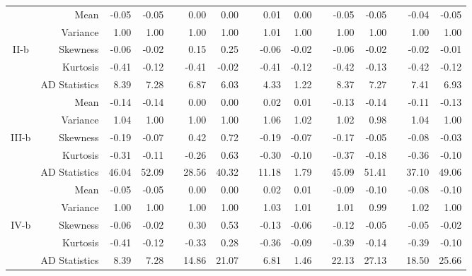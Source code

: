 \documentclass[11pt,authoryear,review,3p,times]{elsarticle}
\begin{document}
\begin{table}[htbp]
{\begin{tabular}{crrrrrrrrrrrrrrr}
			
				& Mean  & -0.05 & -0.05 &       & 0.00  & 0.00  &       & 0.01  & 0.00  &       & -0.05 & -0.05 &       & -0.04 & -0.05 \\
				& Variance    & 1.00  & 1.00  &       & 1.00  & 1.00  &       & 1.01  & 1.00  &       & 1.00  & 1.00  &       & 1.00  & 1.00 \\
				II-b    & Skewness & -0.06 & -0.02 &       & 0.15  & 0.25  &       & -0.06 & -0.02 &       & -0.06 & -0.02 &       & -0.02 & -0.01 \\
				& Kurtosis & -0.41 & -0.12 &       & -0.41 & -0.02 &       & -0.41 & -0.12 &       & -0.42 & -0.13 &       & -0.42 & -0.12 \\
				& AD Statistics & 8.39  & 7.28  &       & 6.87  & 6.03  &       & 4.33  & 1.22  &       & 8.37  & 7.27  &       & 7.41  & 6.93 \\
				\hline
				& Mean  & -0.14 & -0.14 &       & 0.00  & 0.00  &       & 0.02  & 0.01  &       & -0.13 & -0.14 &       & -0.11 & -0.13 \\
				& Variance    & 1.04  & 1.00  &       & 1.00  & 1.00  &       & 1.06  & 1.02  &       & 1.02  & 0.98  &       & 1.04  & 1.00 \\
				III-b    & Skewness & -0.19 & -0.07 &       & 0.42  & 0.72  &       & -0.19 & -0.07 &       & -0.17 & -0.05 &       & -0.08 & -0.03 \\
				& Kurtosis & -0.31 & -0.11 &       & -0.26 & 0.63  &       & -0.30 & -0.10 &       & -0.37 & -0.18 &       & -0.36 & -0.10 \\
				& AD Statistics & 46.04 & 52.09 &       & 28.56 & 40.32 &       & 11.18 & 1.79  &       & 45.09 & 51.41 &       & 37.10 & 49.06 \\
				\hline
					& Mean  & -0.05 & -0.05 &       & 0.00  & 0.00  &       & 0.02  & 0.01  &       & -0.09 & -0.10 &       & -0.08 & -0.10 \\
					& Variance    & 1.00  & 1.00  &       & 1.00  & 1.00  &       & 1.03  & 1.01  &       & 1.01  & 0.99  &       & 1.02  & 1.00 \\
					IV-b     & Skewness & -0.06 & -0.02 &       & 0.30  & 0.53  &       & -0.13 & -0.06 &       & -0.12 & -0.05 &       & -0.05 & -0.02 \\
					& Kurtosis & -0.41 & -0.12 &       & -0.33 & 0.28  &       & -0.36 & -0.09 &       & -0.39 & -0.14 &       & -0.39 & -0.10 \\
					& AD Statistics & 8.39  & 7.28  &       & 14.86 & 21.07 &       & 6.81  & 1.46  &       & 22.13 & 27.13 &       & 18.50 & 25.66 \\

\end{tabular}}
\end{table}
\end{document}

